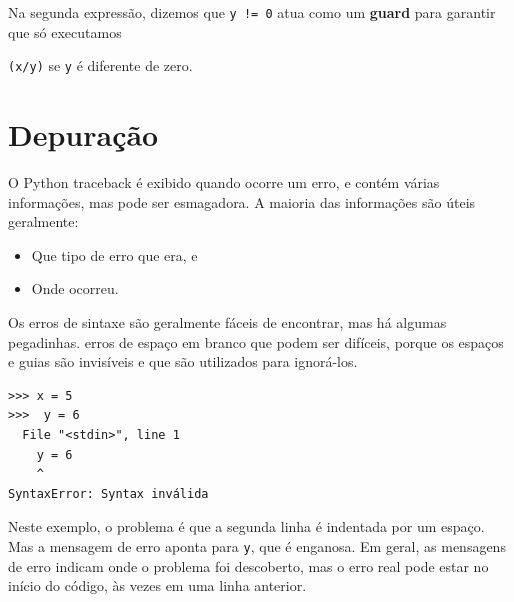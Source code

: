 Na segunda expressão, dizemos que {\tt y != 0} atua como um {\bf guard}
para garantir que só executamos {{\tt (x/y)} se {\tt y} é diferente de zero.



\section{Depuração}
\label{whitespace}

O Python traceback é exibido quando ocorre um erro, e contém
várias informações, mas pode ser esmagadora. A maioria
das informações são úteis geralmente:


\begin{itemize}

\item Que tipo de erro que era, e

\item Onde ocorreu.

\end{itemize}




Os erros de sintaxe são geralmente fáceis de encontrar, mas há algumas
pegadinhas. erros de espaço em branco que podem ser difíceis, porque os espaços e
guias são invisíveis e que são utilizados para ignorá-los.



\beforeverb
\begin{verbatim}
>>> x = 5
>>>  y = 6
  File "<stdin>", line 1
    y = 6
    ^
SyntaxError: Syntax inválida
\end{verbatim}
\afterverb
%
Neste exemplo, o problema é que a segunda linha é indentada por
um espaço. Mas a mensagem de erro aponta para {\tt y}, que é
enganosa. Em geral, as mensagens de erro indicam onde o problema foi
descoberto, mas o erro real pode estar no início do código,
às vezes em uma linha anterior.

}
